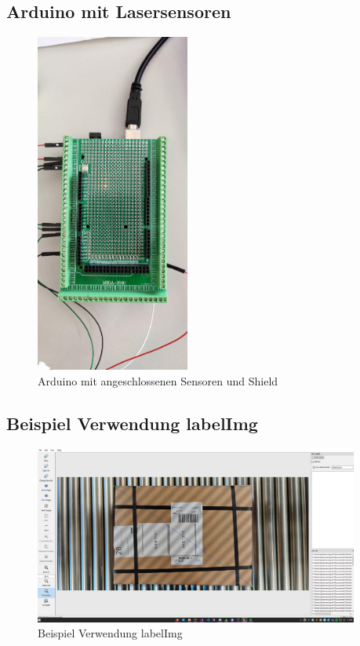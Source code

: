 \newpage
\subsection{Arduino mit Lasersensoren}

\begin{figure}[htpb]
  \centering
  \includegraphics[width=0.45\textwidth]{./pics/Arduino.jpeg}
  \caption{Arduino mit angeschlossenen Sensoren und Shield}
  \label{appendix:fig:arduino}
\end{figure}


\newpage
\subsection{Beispiel Verwendung labelImg}

\begin{figure}[htpb]
  \centering
  \includegraphics[width=0.95\textwidth]{./pics/labelImg.png}
  \caption{Beispiel Verwendung labelImg}
  \label{appendix:fig:labelImg}
\end{figure}


